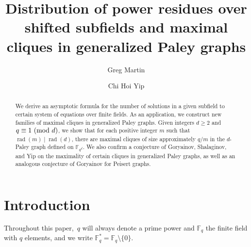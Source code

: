 \documentclass[12pt,reqno]{amsart}
\theoremstyle{definition}
\newcommand{\F}{\mathbb{F}}
\renewcommand{\pmod}[1]{{\ifmmode\text{\rm\ (mod~$#1$)}\else\discretionary{}{}{\hbox{ }}\rm(mod~$#1$)\fi}}
\begin{document}
\title{Distribution of power residues over shifted subfields and maximal cliques in generalized Paley graphs}
\author{Greg Martin}
\address{Department of Mathematics \\ University of British Columbia \\ Vancouver  V6T 1Z2 \\ Canada}
\author{Chi Hoi Yip}
\address{School of Mathematics\\ Georgia Institute of Technology\\ GA 30332\\ United States}


\begin{abstract}
We derive an asymptotic formula for the number of solutions in a given subfield to certain system of equations over finite fields. As an application, we construct new families of maximal cliques in generalized Paley graphs. Given integers $d\ge2$ and $q \equiv 1 \pmod d$, we show that for each positive integer $m$ such that $\operatorname{rad}(m) \mid \operatorname{rad}(d)$, there are maximal cliques of size approximately $q/m$ in the $d$-Paley graph defined on $\mathbb{F}_{q^d}$. We also confirm a conjecture of Goryainov, Shalaginov, and Yip on the maximality of certain cliques in generalized Paley graphs, as well as an analogous conjecture of Goryainov for Peisert graphs.
\end{abstract}

\maketitle

\section{Introduction}

Throughout this paper,~$q$ will always denote a prime power and $\F_q$ the finite field with $q$ elements, and we write $\F_q^*=\F_q \setminus \{0\}$. 
\end{document}
